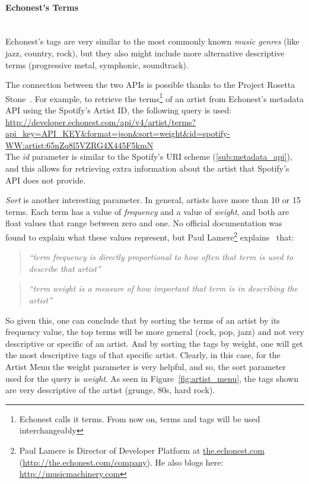       \paragraph{Echonest's Terms} \hfill \\
      Echonest's tags are very similar to the most commonly known \emph{music genres} (like jazz, country, rock), but they also might include more alternative descriptive terms (progressive metal, symphonic, soundtrack).

      The connection between the two APIs is possible thanks to the Project Rosetta Stone~\cite{rosettastone}.
      For example, to retrieve the terms\footnote{Echonest calls it terms. From now on, terms and tags will be used interchangeably} of an artist from Echonest's metadata API using the Spotify's Artist ID, the following query is used: \\

      \url{
        http://developer.echonest.com/api/v4/artist/terms?api_key=API_KEY&format=json&sort=weight&id=spotify-WW:artist:65nZq8l5VZRG4X445F5kmN
      } \\

      The \emph{id} parameter is similar to the Spotify's URI scheme (\ref{sub:metadata_api}), and this allows for retrieving extra information about the artist that Spotify's API does not provide.

      \emph{Sort} is another interesting parameter. 
      In general, artists have more than 10 or 15 terms.
      Each term has a value of \emph{frequency} and a value of \emph{weight}, and both are float values that range between zero and one.
      No official documentation was found to explain what these values represent, but Paul Lamere\footnote{Paul Lamere is Director of Developer Platform at \url{the.echonest.com} (\url{http://the.echonest.com/company}). He also blogs here: \url{http://musicmachinery.com}} explains~\cite{lamereterms} that:

      \begin{quote}
      \emph{
        ``term frequency is directly proportional to how often that term is used to describe that artist''
      }
      \end{quote}

      \begin{quote}
      \emph{
        ``term weight is a measure of how important that term is in describing the artist''
      }
      \end{quote}

      So given this, one can conclude that by sorting the terms of an artist by its frequency value, the top terms will be more general (rock, pop, jazz) and not very descriptive or specific of an artist.
      And by sorting the tags by weight, one will get the most descriptive tags of that specific artist.
      Clearly, in this case, for the Artist Menu the weight parameter is very helpful, and so, the sort parameter used for the query is \emph{weight}.
      As seen in Figure~\ref{fig:artist_menu}, the tags shown are very descriptive of the artist (grunge, 80s, hard rock).

